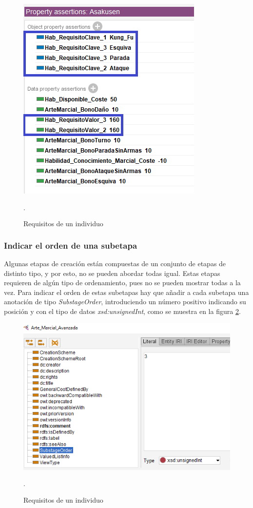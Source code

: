 \begin{figure}[H]
    \centering
    \includegraphics[scale=0.6]{Figures/Protege/Requisitos.png}
    \caption{Requisitos de un individuo}.
    \label{requisitos}
\end{figure}

\subsubsection{Indicar el orden de una subetapa}
Algunas etapas de creación están compuestas de un conjunto de etapas de distinto tipo, y por esto, no se pueden abordar todas igual.
Estas etapas requieren de algún tipo de ordenamiento, pues no se pueden mostrar todas a la vez. Para indicar el orden de estas subetapas
hay que añadir a cada subetapa una anotación de tipo \textit{SubstageOrder}, introduciendo un número positivo indicando su posición 
y con el tipo de datos \textit{xsd:unsignedInt}, como se muestra en la figura \ref*{SubstageOrder}.

\begin{figure}[H]
    \centering
    \includegraphics[scale=0.6]{Figures/Protege/SubstageOrder.png}
    \caption{Requisitos de un individuo}.
    \label{SubstageOrder}
\end{figure}

